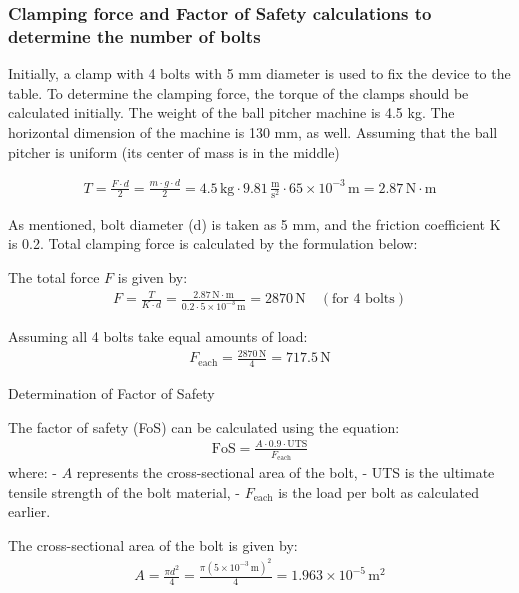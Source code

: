 \documentclass[12pt]{report}
\begin{document}
\subsubsection{Clamping force and Factor of Safety calculations to determine the number of bolts }

Initially, a clamp with 4 bolts with 5 mm diameter is used to fix the device to the table.
To determine the clamping force, the torque of the clamps should be calculated initially. The weight of the ball pitcher machine is 4.5 kg. The horizontal dimension of the machine is 130 mm, as well. Assuming that the ball pitcher is uniform (its center of mass is in the middle)

\begin{align}
T = \frac{F \cdot d}{2} = \frac{m \cdot g \cdot d}{2} = 4.5 \, \text{kg} \cdot 9.81 \, \frac{\text{m}}{\text{s}^2} \cdot 65 \times 10^{-3} \, \text{m} = 2.87 \, \text{N} \cdot \text{m}
\end{align}

As mentioned, bolt diameter (d) is taken as 5 mm, and the friction coefficient K is 0.2.
Total clamping force is calculated by the formulation below:

The total force \( F \) is given by:
\begin{align}
F = \frac{T}{K \cdot d} = \frac{2.87 \, \text{N} \cdot \text{m}}{0.2 \cdot 5 \times 10^{-3} \, \text{m}} = 2870 \, \text{N} \quad (\text{for 4 bolts})
\end{align}

Assuming all 4 bolts take equal amounts of load:
\begin{align}
F_{\text{each}} = \frac{2870 \, \text{N}}{4} = 717.5 \, \text{N}
\end{align}

Determination of Factor of Safety

The factor of safety (FoS) can be calculated using the equation:
\begin{align}
\text{FoS} = \frac{A \cdot 0.9 \cdot \text{UTS}}{F_{\text{each}}}
\end{align}
where:
- \( A \) represents the cross-sectional area of the bolt,
- UTS is the ultimate tensile strength of the bolt material,
- \( F_{\text{each}} \) is the load per bolt as calculated earlier.

The cross-sectional area of the bolt is given by:
\begin{align}
A = \frac{\pi d^2}{4} = \frac{\pi \left( 5 \times 10^{-3} \, \text{m} \right)^2}{4} = 1.963 \times 10^{-5} \, \text{m}^2
\end{align}
\end{document}
